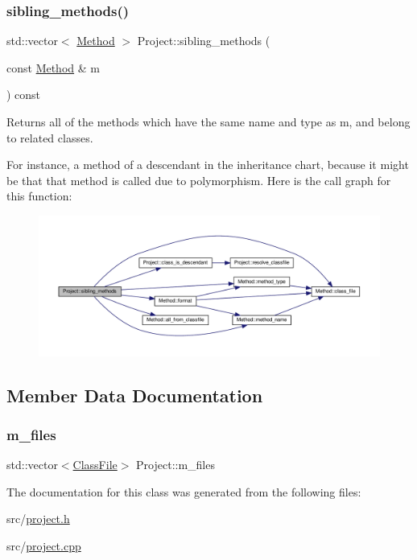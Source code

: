 \subsubsection{\texorpdfstring{sibling\+\_\+methods()}{sibling\_methods()}}
{\footnotesize\ttfamily std\+::vector$<$ \hyperlink{classMethod}{Method} $>$ Project\+::sibling\+\_\+methods (\begin{DoxyParamCaption}\item[{const \hyperlink{classMethod}{Method} \&}]{m }\end{DoxyParamCaption}) const}

Returns all of the methods which have the same name and type as {\ttfamily m}, and belong to related classes.

For instance, a method of a descendant in the inheritance chart, because it might be that that method is called due to polymorphism. Here is the call graph for this function\+:\nopagebreak
\begin{figure}[H]
\begin{center}
\leavevmode
\includegraphics[width=350pt]{classProject_afee58125bfee1c7a1871be7805e855fa_cgraph}
\end{center}
\end{figure}


\subsection{Member Data Documentation}
\mbox{\label{classProject_a33de2bfb90183333d5e7c422bc5d6396}} 
\subsubsection{\texorpdfstring{m\+\_\+files}{m\_files}}
{\footnotesize\ttfamily std\+::vector$<$\hyperlink{classfile_8h_a00b46b60bc40e813e9fb1bb049174346}{Class\+File}$>$ Project\+::m\+\_\+files\hspace{0.3cm}{\ttfamily [private]}}



The documentation for this class was generated from the following files\+:\begin{DoxyCompactItemize}
\item 
src/\hyperlink{project_8h}{project.\+h}\item 
src/\hyperlink{project_8cpp}{project.\+cpp}\end{DoxyCompactItemize}
